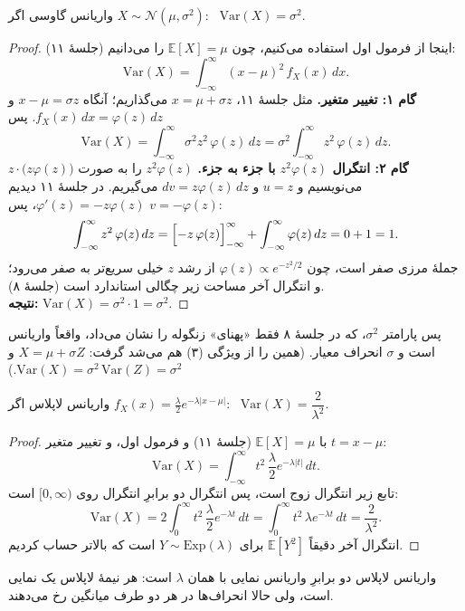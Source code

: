 \begin{proposition}[label=prop:V-gauss]{واریانس گاوسی}
  اگر $X\sim\mathcal N(\mu,\sigma^2)$: \ $\mathrm{Var}(X)=\sigma^2$.
\end{proposition}
\begin{proof}
  اینجا از فرمول اول استفاده می‌کنیم، چون $\mathbb E[X]=\mu$ را می‌دانیم (جلسهٔ ۱۱):
  \[ \mathrm{Var}(X)=\int_{-\infty}^{\infty}(x-\mu)^2\,f_X(x)\,dx. \]
  \textbf{گام ۱: تغییر متغیر.} مثل جلسهٔ ۱۱، $x=\mu+\sigma z$ می‌گذاریم؛ آنگاه $x-\mu=\sigma z$ و $f_X(x)\,dx=\varphi(z)\,dz$. پس
  \[ \mathrm{Var}(X)=\int_{-\infty}^{\infty}\sigma^2z^2\,\varphi(z)\,dz=\sigma^2\int_{-\infty}^{\infty}z^2\,\varphi(z)\,dz. \]
  \textbf{گام ۲: انتگرال $z^2\varphi(z)$ با جزء به جزء.} $z^2\varphi(z)$ را به صورت $z\cdot\bigl(z\varphi(z)\bigr)$ می‌نویسیم و $u=z$ و $dv=z\varphi(z)\,dz$ می‌گیریم. در جلسهٔ ۱۱ دیدیم $\varphi'(z)=-z\varphi(z)$، پس $v=-\varphi(z)$:
  \[ \int_{-\infty}^{\infty}z^2\,\varphi(z)\,dz=\Bigl[-z\,\varphi(z)\Bigr]_{-\infty}^{\infty}+\int_{-\infty}^{\infty}\varphi(z)\,dz=0+1=1. \]
  جملهٔ مرزی صفر است، چون $\varphi(z)\propto e^{-z^2/2}$ از رشد $z$ خیلی سریع‌تر به صفر می‌رود؛ و انتگرال آخر مساحت زیر چگالی استاندارد است (جلسهٔ ۸).\\
  \textbf{نتیجه:} $\mathrm{Var}(X)=\sigma^2\cdot1=\sigma^2$.
\end{proof}
پس پارامتر $\sigma^2$، که در جلسهٔ ۸ فقط «پهنای» زنگوله را نشان می‌داد، واقعاً واریانس است و $\sigma$ انحراف معیار. (همین را از ویژگی (۳) هم می‌شد گرفت: $X=\mu+\sigma Z$ و $\mathrm{Var}(X)=\sigma^2\,\mathrm{Var}(Z)=\sigma^2$.)

\begin{proposition}[label=prop:V-lap]{واریانس لاپلاس}
  اگر $f_X(x)=\frac\lambda2e^{-\lambda|x-\mu|}$: \ $\mathrm{Var}(X)=\dfrac{2}{\lambda^2}$.
\end{proposition}
\begin{proof}
  با $\mathbb E[X]=\mu$ (جلسهٔ ۱۱) و فرمول اول، و تغییر متغیر $t=x-\mu$:
  \[ \mathrm{Var}(X)=\int_{-\infty}^{\infty}t^2\,\frac\lambda2e^{-\lambda|t|}\,dt. \]
  تابع زیر انتگرال زوج است، پس انتگرال دو برابرِ انتگرال روی $[0,\infty)$ است:
  \[ \mathrm{Var}(X)=2\int_0^\infty t^2\,\frac\lambda2e^{-\lambda t}\,dt=\int_0^\infty t^2\,\lambda e^{-\lambda t}\,dt=\frac{2}{\lambda^2}. \]
  انتگرال آخر دقیقاً $\mathbb E[Y^2]$ برای $Y\sim\mathrm{Exp}(\lambda)$ است که بالاتر حساب کردیم.
\end{proof}
واریانس لاپلاس دو برابرِ واریانس نمایی با همان $\lambda$ است: هر نیمهٔ لاپلاس یک نمایی است، ولی حالا انحراف‌ها در هر دو طرف میانگین رخ می‌دهند.

